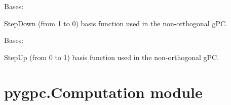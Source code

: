\documentclass[letterpaper,10pt,english,openany,oneside]{sphinxmanual}
\begin{document}

\begin{fulllineitems}
\label{\detokenize{pygpc:pygpc.BasisFunction.StepDown}}
Bases: {\hyperref[\detokenize{pygpc:pygpc.BasisFunction.BasisFunction}]{}}

StepDown (from 1 to 0) basis function used in the non-orthogonal gPC.

\end{fulllineitems}


\begin{fulllineitems}
\label{\detokenize{pygpc:pygpc.BasisFunction.StepUp}}
Bases: {\hyperref[\detokenize{pygpc:pygpc.BasisFunction.BasisFunction}]{}}

StepUp (from 0 to 1) basis function used in the non-orthogonal gPC.

\end{fulllineitems}



\section{pygpc.Computation module}
\label{\detokenize{pygpc:module-pygpc.Computation}}\label{\detokenize{pygpc:pygpc-computation-module}}
\end{document}
